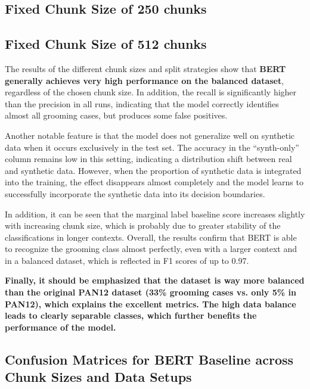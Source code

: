 


\subsection{Fixed Chunk Size of 250 chunks}



\subsection{Fixed Chunk Size of 512 chunks}



The results of the different chunk sizes and split strategies show that \textbf{BERT generally achieves very high performance on the balanced dataset}, regardless of the chosen chunk size. In addition, the recall is significantly higher than the precision in all runs, indicating that the model correctly identifies almost all grooming cases, but produces some false positives. 

Another notable feature is that the model does not generalize well on synthetic data when it occurs exclusively in the test set. The accuracy in the “synth-only” column remains low in this setting, indicating a distribution shift between real and synthetic data. However, when the proportion of synthetic data is integrated into the training, the effect disappears almost completely and the model learns to successfully incorporate the synthetic data into its decision boundaries.

In addition, it can be seen that the marginal label baseline score increases slightly with increasing chunk size, which is probably due to greater stability of the classifications in longer contexts. Overall, the results confirm that BERT is able to recognize the grooming class almost perfectly, even with a larger context and in a balanced dataset, which is reflected in F1 scores of up to 0.97.

\textbf{Finally, it should be emphasized that the dataset is way more balanced than the original PAN12 dataset (33\% grooming cases vs. only 5\% in PAN12), which explains the excellent metrics. The high data balance leads to clearly separable classes, which further benefits the performance of the model.}


\subsection{Confusion Matrices for BERT Baseline across Chunk Sizes and Data Setups}

